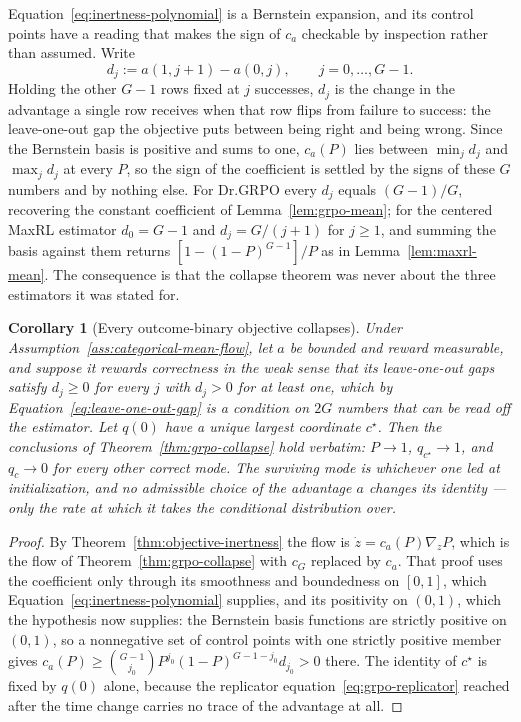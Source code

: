 \documentclass{article}
\newcommand{\1}{\mathbf 1}
\newtheorem{corollary}[lemma]{Corollary}
\theoremstyle{remark}
\theoremstyle{definition}
\theoremstyle{plain}
\begin{document}
Equation~\eqref{eq:inertness-polynomial} is a Bernstein expansion, and its
control points have a reading that makes the sign of $c_a$ checkable by
inspection rather than assumed. Write
\begin{equation}
 d_j:=a(1,j+1)-a(0,j),\qquad j=0,\ldots,G-1 .
 \label{eq:leave-one-out-gap}
\end{equation}
Holding the other $G-1$ rows fixed at $j$ successes, $d_j$ is the change in the
advantage a single row receives when that row flips from failure to success:
the leave-one-out gap the objective puts between being right and being wrong.
Since the Bernstein basis is positive and sums to one, $c_a(P)$ lies between
$\min_jd_j$ and $\max_jd_j$ at every $P$, so the sign of the coefficient is
settled by the signs of these $G$ numbers and by nothing else.
For Dr.GRPO every $d_j$ equals $(G-1)/G$, recovering the constant coefficient
of Lemma~\ref{lem:grpo-mean}; for the centered MaxRL estimator $d_0=G-1$ and
$d_j=G/(j+1)$ for $j\ge1$, and summing the basis against them returns
$[1-(1-P)^{G-1}]/P$ as in Lemma~\ref{lem:maxrl-mean}. The consequence is that
the collapse theorem was never about the three estimators it was stated for.

\begin{corollary}[Every outcome-binary objective collapses]
\label{cor:class-collapse}
Under Assumption~\ref{ass:categorical-mean-flow}, let $a$ be bounded and
reward measurable, and suppose it rewards correctness in the weak sense that
its leave-one-out gaps satisfy $d_j\ge0$ for every $j$ with $d_j>0$ for at
least one, which by Equation~\eqref{eq:leave-one-out-gap} is a condition on
$2G$ numbers that can be read off the estimator. Let $q(0)$ have a unique
largest coordinate $c^\star$. Then the conclusions of Theorem~\ref{thm:grpo-collapse}
hold verbatim: $P\to1$, $q_{c^\star}\to1$, and $q_c\to0$ for every other
correct mode. The surviving mode is whichever one led at initialization, and
no admissible choice of the advantage $a$ changes its identity --- only the
rate at which it takes the conditional distribution over.
\end{corollary}

\begin{proof}
By Theorem~\ref{thm:objective-inertness} the flow is
$\dot z=c_a(P)\nabla_zP$, which is the flow of
Theorem~\ref{thm:grpo-collapse} with $c_G$ replaced by $c_a$. That proof uses
the coefficient only through its smoothness and boundedness on $[0,1]$, which
Equation~\eqref{eq:inertness-polynomial} supplies, and its positivity on
$(0,1)$, which the hypothesis now supplies: the Bernstein basis functions are
strictly positive on $(0,1)$, so a nonnegative set of control points with one
strictly positive member gives $c_a(P)\ge\binom{G-1}{j_0}P^{j_0}(1-P)^{G-1-j_0}
d_{j_0}>0$ there. The identity of $c^\star$ is fixed by $q(0)$ alone, because
the replicator equation~\eqref{eq:grpo-replicator} reached after the time
change carries no trace of the advantage at all.
\end{proof}
\end{document}
